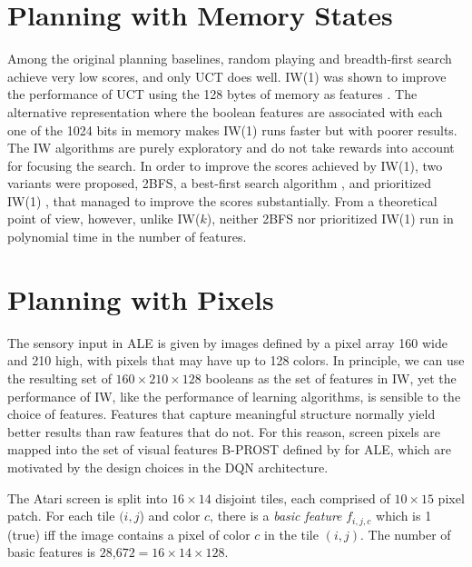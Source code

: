 \documentclass[letterpaper]{article}
\newcommand{\CHECK}[1]{\textcolor{red}{\bf *** #1 ***}}
\begin{document}
\section{Planning  with Memory  States}

Among the  original planning baselines,
random playing and breadth-first search
achieve very  low scores, and only UCT \cite{uct}
does well.  IW(1) was shown to improve the performance
of UCT using the 128 bytes of memory as features \cite{nir:ijcai2015}.
The alternative representation where the boolean features
are associated with each one of the  1024 bits in memory
makes  IW(1)  runs  faster but with poorer results.
The IW algorithms  are purely exploratory  and do not take rewards into account
for focusing the search. In order  to improve the scores achieved by IW(1),
two variants  were proposed,  2BFS, a best-first search algorithm
\cite{nir:ijcai2015}, and prioritized IW(1)  \cite{carmel:ijcai2016},
that managed to improve the scores substantially.  From a theoretical point of view,
however, unlike  IW($k$), neither 2BFS nor prioritized IW(1) run in polynomial time in the number of features. 

\section{Planning with Pixels}

The sensory input in ALE is given by images defined by a pixel array 160 wide and 210 high, with 
pixels that  may have up to 128 colors. In principle, we can use the resulting set of
$160 \times 210 \times 128$ booleans
as the set of features in IW, yet
the performance of IW, like the performance of learning algorithms,
is sensible to the choice of features. Features that capture
meaningful structure  normally yield better results than raw
features that do not. For this reason, screen pixels are mapped  into the
set of visual features B-PROST defined by \citeauthor{shallow} for ALE, %
which are motivated by the design choices in the DQN architecture. 

The Atari screen is split into $16 \times 14$ disjoint tiles, each comprised of  $10 \times 15$  pixel patch.
For each tile $(i,j$) and color $c$, there is a \emph{basic feature}
$f_{i,j,c}$ which is 1 (true) iff the image contains a
pixel of color $c$ in the tile $(i,j)$.
The number of basic features is $\text{28,672} = 16 \times 14 \times 128$.
\end{document}
